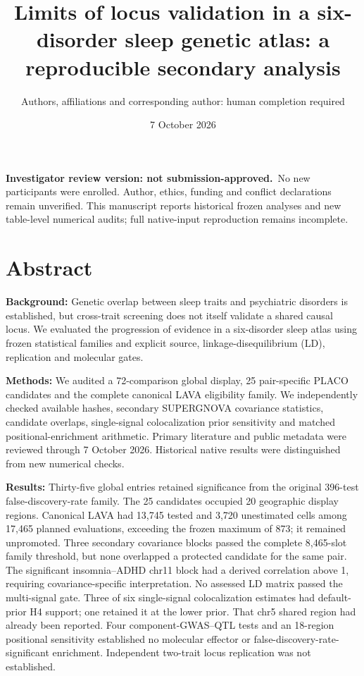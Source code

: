 \documentclass[11pt]{article}
\title{Limits of locus validation in a six-disorder sleep genetic atlas: a reproducible secondary analysis}
\author{Authors, affiliations and corresponding author: human completion required}
\date{7 October 2026}
\newcommand{\held}{\textbf{Investigator review version: not submission-approved.}}
\begin{document}
\maketitle
\held\ No new participants were enrolled. Author, ethics, funding and conflict declarations remain unverified. This manuscript reports historical frozen analyses and new table-level numerical audits; full native-input reproduction remains incomplete.

\section*{Abstract}
\textbf{Background:} Genetic overlap between sleep traits and psychiatric disorders is established, but cross-trait screening does not itself validate a shared causal locus. We evaluated the progression of evidence in a six-disorder sleep atlas using frozen statistical families and explicit source, linkage-disequilibrium (LD), replication and molecular gates.

\textbf{Methods:} We audited a 72-comparison global display, 25 pair-specific PLACO candidates and the complete canonical LAVA eligibility family. We independently checked available hashes, secondary SUPERGNOVA covariance statistics, candidate overlaps, single-signal colocalization prior sensitivity and matched positional-enrichment arithmetic. Primary literature and public metadata were reviewed through 7 October 2026. Historical native results were distinguished from new numerical checks.

\textbf{Results:} Thirty-five global entries retained significance from the original 396-test false-discovery-rate family. The 25 candidates occupied 20 geographic display regions. Canonical LAVA had 13,745 tested and 3,720 unestimated cells among 17,465 planned evaluations, exceeding the frozen maximum of 873; it remained unpromoted. Three secondary covariance blocks passed the complete 8,465-slot family threshold, but none overlapped a protected candidate for the same pair. The significant insomnia--ADHD chr11 block had a derived correlation above 1, requiring covariance-specific interpretation. No assessed LD matrix passed the multi-signal gate. Three of six single-signal colocalization estimates had default-prior H4 support; one retained it at the lower prior. That chr5 shared region had already been reported. Four component-GWAS--QTL tests and an 18-region positional sensitivity established no molecular effector or false-discovery-rate-significant enrichment. Independent two-trait locus replication was not established.
\end{document}
